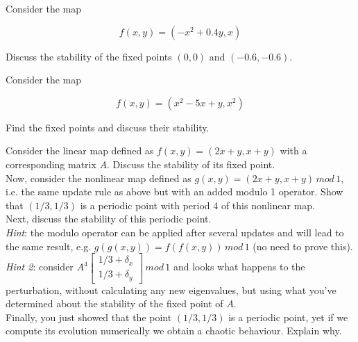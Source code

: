 \pagebreak

\begin{exer}
Consider the map 

$$f(x,y) = (-x^2+0.4y, x)$$

Discuss the stability of the fixed points $(0,0)$ and $(-0.6,-0.6)$.

\end{exer}

\begin{exer}
Consider the map 

$$f(x,y) = (x^2-5x+y, x^2)$$

Find the fixed points and discuss their stability.
\end{exer}


\begin{exer}
Consider the linear map defined as $f(x,y) = (2x+y, x+y)$ with a corresponding matrix $A$. Discuss the stability of its fixed point.\\

Now, consider the nonlinear map defined as $g(x,y) = (2x+y, x+y)\, mod \, 1$, i.e. the same update rule as above but with an added modulo 1 operator. Show that $(1/3, 1/3)$ is a periodic point with period 4 of this nonlinear map.\\

Next, discuss the stability of this periodic point.\\

\textit{Hint}: the modulo operator can be applied after several updates and will lead to the same result, e.g.  $g(g(x,y)) = f(f(x,y)) \, mod \, 1$ (no need to prove this).\\
\textit{Hint 2}: consider $A^4 \begin{bmatrix} 1/3 + \delta_x \\ 1/3 + \delta_y \end{bmatrix} \, mod \, 1$ and looks what happens to the perturbation, without calculating any new eigenvalues, but using what you've determined about the stability of the fixed point of $A$.\\

Finally, you just showed that the point $(1/3, 1/3)$ is a periodic point, yet if we compute its evolution numerically we obtain a chaotic behaviour. Explain why.
\end{exer}


\pagebreak


